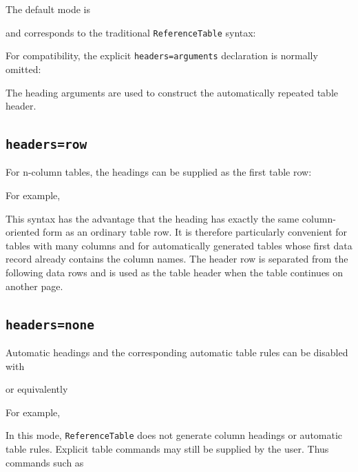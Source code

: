\documentclass[
11pt,
a4paper,
oneside
]{scrbook}
\begin{document}
The default mode is




and corresponds to the traditional \texttt{ReferenceTable} syntax:




For compatibility, the explicit \texttt{headers=arguments} declaration is
normally omitted:




The heading arguments are used to construct the automatically repeated table
header.


\subsection{\texttt{headers=row}}

For n-column tables, the headings can be supplied as the first table row:




For example,




This syntax has the advantage that the heading has exactly the same
column-oriented form as an ordinary table row. It is therefore particularly
convenient for tables with many columns and for automatically generated
tables whose first data record already contains the column names.
The header row is separated from the following data rows and is used as the
table header when the table continues on another page.

\subsection{\texttt{headers=none}}

Automatic headings and the corresponding automatic table rules can be
disabled with




or equivalently




For example,




In this mode, \texttt{ReferenceTable} does not generate column headings or
automatic table rules. Explicit table commands may still be supplied by the
user. Thus commands such as
\end{document}
